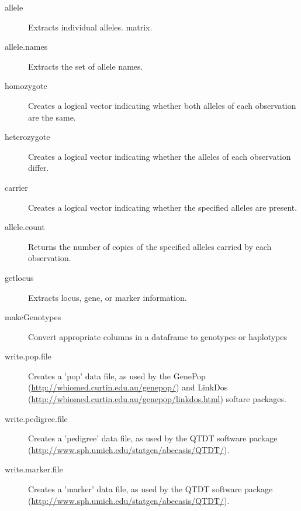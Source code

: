 \documentclass{report}
\begin{document}
\begin{description}
  
\item[allele] Extracts individual alleles.
  matrix.
  
\item[allele.names] Extracts the set of allele names.
  
\item[homozygote] Creates a logical vector indicating whether both
  alleles of each observation are the same.
  
\item[heterozygote] Creates a logical vector indicating whether the
  alleles of each observation differ.
  
\item[carrier] Creates a logical vector indicating whether
  the specified alleles are present.
  
\item[allele.count] Returns the number of copies of the specified
  alleles carried by each observation.
  
\item[getlocus] Extracts locus, gene, or marker information.
  
\item[makeGenotypes] Convert appropriate columns in a dataframe to
  genotypes or haplotypes

\item[write.pop.file] Creates a 'pop' data file, as used by the
  GenePop (\url{http://wbiomed.curtin.edu.au/genepop/}) and LinkDos
  (\url{http://wbiomed.curtin.edu.au/genepop/linkdos.html}) softare
  packages.
     
\item[write.pedigree.file] Creates a 'pedigree' data file, as used by
  the QTDT software package
  (\url{http://www.sph.umich.edu/statgen/abecasis/QTDT/}).
  
\item[write.marker.file] Creates a 'marker' data file, as used by the
  QTDT software package
  (\url{http://www.sph.umich.edu/statgen/abecasis/QTDT/}).
\end{description}
\end{document}
